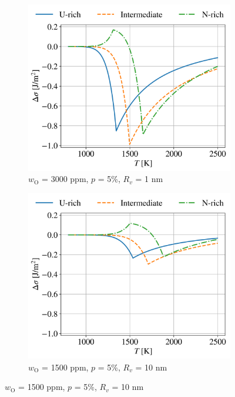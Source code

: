 \documentclass[preprint,12pt,sort&compress]{elsarticle}
\newcommand{\?}{\stackrel{?}{=}}
\begin{document}
\begin{figure}[h!]
\begin{subfigure}{0.48\textwidth}
\end{subfigure}
\hfill
\begin{subfigure}{0.48\textwidth}
    \includegraphics[width=\textwidth]{Delta_sigma_5_3000_1e-09.png}
    \caption{$w_\text{O}$ = 3000 ppm, $p$ = 5\%, $R_v$ = 1 nm}
    \label{Fig:3000_5_1}
\end{subfigure}
\begin{subfigure}{0.48\textwidth}
    \includegraphics[width=\textwidth]{Delta_sigma_5_1500_1e-08.png}
    \caption{$w_\text{O}$ = 1500 ppm, $p$ = 5\%, $R_v$ = 10 nm}
    \label{Fig:1500_0.05_10}

\end{subfigure}
\end{figure}
\end{document}
